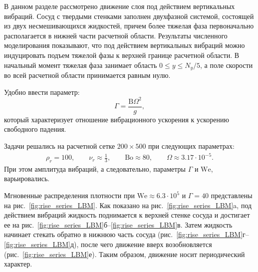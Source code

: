 \documentclass[12pt,a4paper]{article}
\begin{document}
В данном разделе рассмотрено движение слоя под действием вертикальных вибраций. Сосуд с твердыми стенками заполнен двухфазной системой, состоящей из двух несмешивающихся жидкостей, причем более тяжелая фаза первоначально располагается в нижней части расчетной области. Результаты численного моделирования показывают, что под действием вертикальных вибраций можно индуцировать подъем тяжелой фазы к верхней границе расчетной области. В начальный момент тяжелая фаза занимает область $0 \le y \le N_y/5$, а поле скорости во всей расчетной области принимается равным нулю.

Удобно ввести параметр:
\begin{equation}
\Gamma = \frac{\mathrm{B} \Omega^2}{g},
\end{equation}
который характеризует отношение вибрационного ускорения к ускорению свободного падения.

Задачи решались на расчетной сетке $200 \times 500$ при следующих параметрах:
$$
\begin{aligned}
	\rho_r = 100, \qquad \nu_r \approx \frac{1}{3},\qquad \mathrm{Bo} \approx 80, \qquad \Omega \approx 3.17 \cdot 10^{-5}.
\end{aligned}
$$
При этом амплитуда вибраций, а следовательно, параметры $\Gamma$ и $\mathrm{We}$, варьировались.



Мгновенные распределения плотности при $\mathrm{We} \approx 6.3 \cdot 10^{5}$ и $\Gamma = 40$ представлены на рис.~\ref{fig:rise_series_LBM}. Как показано на рис.~\ref{fig:rise_series_LBM}a, под действием вибраций жидкость поднимается к верхней стенке сосуда и достигает ее на рис.~\ref{fig:rise_series_LBM}б--\ref{fig:rise_series_LBM}в. Затем жидкость начинает стекать обратно в нижнюю часть сосуда (рис.~\ref{fig:rise_series_LBM}г--\ref{fig:rise_series_LBM}д), после чего движение вверх возобновляется (рис.~\ref{fig:rise_series_LBM}е). Таким образом, движение носит периодический характер.
\end{document}
